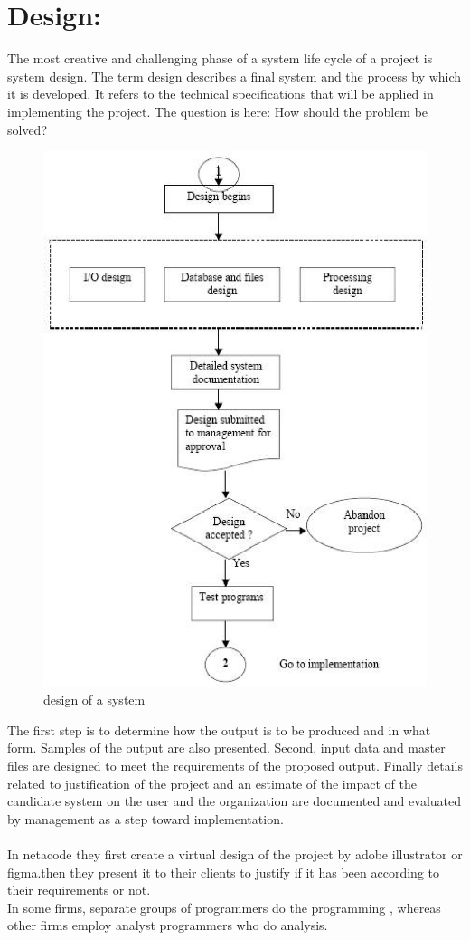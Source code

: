 \documentclass[a4paper,12pt]{report}
\begin{document}
 \section{Design:}
 The most creative and challenging phase of a system life cycle of a project is system design. The term design describes a final system and the process by which it is developed. It refers to the technical specifications that will be applied in implementing the project. The question is here: How should the problem be solved?\\
 
\begin{figure}[h]
	\centering
	\includegraphics[width=0.7\linewidth]{fig-2;chap-2}
	\caption{design of a system}
	\label{fig:fig-2chap-2}
\end{figure}
The first step is to determine how the output is to be produced and in what form. Samples of the output are also presented. Second, input data and master files  are designed to meet the requirements of the proposed output. Finally details related to justification of the project and an estimate of the impact of the candidate system on the user and the organization  are documented and evaluated by management as a step toward implementation.
\\ \\
In netacode they first create a virtual design of the project by adobe illustrator or figma.then they present it to their clients to justify if it has been according to their requirements or not.\\
In some firms, separate groups of programmers do the programming , whereas other firms employ analyst programmers who do analysis.
\end{document}
